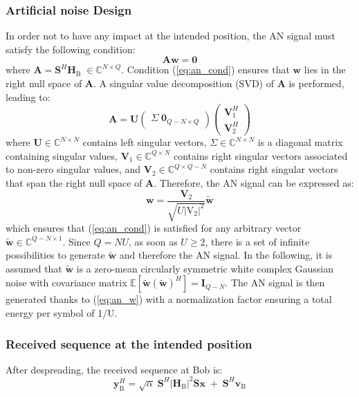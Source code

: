 \documentclass[journal,comsoc]{IEEEtran}
\newcommand{\module}[1]{\left|#1\right|}
\newcommand{\EX}[1]{\mathbb{E} \left[#1\right]}%
\newcommand{\HB}{\textbf{H}_{\text{B}}}
\newcommand{\spread}{\textbf{S}}
\newcommand{\w}{\textbf{w}}
\newcommand{\mat}[1]{\boldsymbol{\mathrm{#1}}}
\newcommand{\C}{\mathbb{C}}
\begin{document}
\subsubsection{Artificial noise Design}\label{sec:artificial-noise-design}
In order not to have any impact at the intended position, the AN signal must satisfy the following condition:
\begin{equation}
	\textbf{A} \w \; = \; \textbf{0}
	\label{eq:an_cond}
\end{equation}
where $\textbf{A} = \spread^H\HB\; \in \C^{N\times Q}$. Condition (\ref{eq:an_cond}) ensures that $\w$ lies in the right null space of $\textbf{A}$. A singular value decomposition (SVD) of $\textbf{A}$ is performed, leading to:
\begin{equation}
	\textbf{A} = \textbf{U} 
	\begin{pmatrix}
		\Sigma \; \textbf{0}_{Q-N\times Q}
	\end{pmatrix}
	\begin{pmatrix}
		\textbf{V}_1^H \\
		\textbf{V}_2^H
	\end{pmatrix}
	\label{eq:an_svd}
\end{equation}
where $\textbf{U} \in \C^{N \times N}$ contains left singular vectors, $\Sigma \in \C^{N \times N}$ is a diagonal matrix containing singular values, $\textbf{V}_1 \in \C^{Q \times N}$ contains right singular vectors associated to non-zero singular values, and $\textbf{V}_2 \in \C^{Q \times Q-N}$ contains right singular vectors that span the right null space of $\textbf{A}$. Therefore, the AN signal can be expressed as:
\begin{equation}
	\w = \frac{\textbf{V}_2}{\sqrt{U |\mat{V_2}|^2}} \tilde{\w}
	\label{eq:an_w}
\end{equation}
which ensures that (\ref{eq:an_cond}) is satisfied for any arbitrary vector $\tilde{\w} \in \C^{Q-N \times 1}$. Since $Q = NU$, as soon as $U\geq 2$, there is a set of infinite possibilities to generate $\tilde{\w}$ and therefore the AN signal. In the following, it is assumed that $\tilde{\w}$ is a zero-mean circularly symmetric white complex Gaussian noise with covariance matrix $\EX{\tilde{\w}(\tilde{\w})^H} = \textbf{I}_{Q-N }$. The AN signal is then generated thanks to (\ref{eq:an_w}) with a normalization factor ensuring a total energy per symbol of 1/U.


\subsubsection{Received sequence at the intended position}
After despreading, the received sequence at Bob is: 
\begin{equation}
	\textbf{y}_{\text{B}}^H = \sqrt{\alpha} \; \spread^H \module{\HB}^2 \spread \textbf{x} \;  +  \;  \spread^H \textbf{v}_\text{B} 
	\label{eq:rx_bob_AN}
\end{equation}
\end{document}

